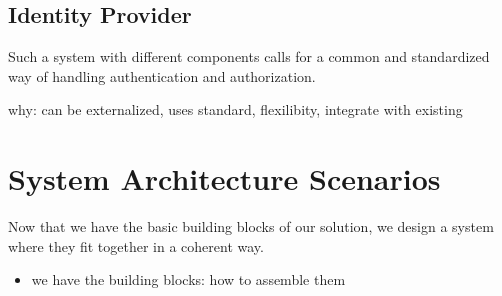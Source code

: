



\subsection{Identity Provider}

Such a system with different components calls for a common and standardized way of handling authentication and authorization.


why: can be externalized, uses standard, flexilibity, integrate with existing


\section{System Architecture Scenarios}

Now that we have the basic building blocks of our solution, we design a system where they fit together in a coherent way.


\begin{itemize}
    \item we have the building blocks: how to assemble them
\end{itemize}








